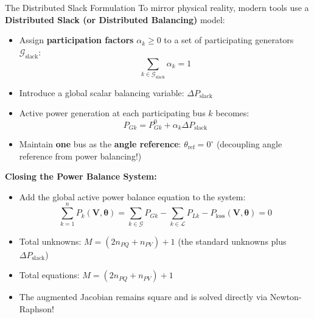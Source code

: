 \begin{frame}[allowframebreaks]{The Distributed Slack Formulation}
    To mirror physical reality, modern tools use a \textbf{Distributed Slack (or Distributed Balancing)} model:
    
    \begin{itemize}
        \item Assign \textbf{participation factors} $\alpha_k \ge 0$ to a set of participating generators $\mathcal{G}_{\text{slack}}$:
        $$\sum_{k \in \mathcal{G}_{\text{slack}}} \alpha_k = 1$$
        \item Introduce a global scalar balancing variable: $\Delta P_{\text{slack}}$
        \item Active power generation at each participating bus $k$ becomes:
        $$P_{Gk} = P_{Gk}^0 + \alpha_k \Delta P_{\text{slack}}$$
        \item Maintain \textbf{one} bus as the \textbf{angle reference}: $\theta_{\text{ref}} = 0^\circ$ (decoupling angle reference from power balancing!)
    \end{itemize}
    \textbf{Closing the Power Balance System:}
    \begin{itemize}
        \item Add the global active power balance equation to the system:
        $$\sum_{k=1}^n P_k(\mathbf{V}, \boldsymbol{\theta}) = \sum_{k \in \mathcal{G}} P_{Gk} - \sum_{k \in \mathcal{L}} P_{Lk} - P_{\text{loss}}(\mathbf{V}, \boldsymbol{\theta}) = 0$$
        \item Total unknowns: $M = (2n_{PQ} + n_{PV}) + 1$ (the standard unknowns plus $\Delta P_{\text{slack}}$)
        \item Total equations: $M = (2n_{PQ} + n_{PV}) + 1$
        \item The augmented Jacobian remains square and is solved directly via Newton-Raphson!
    \end{itemize}
\end{frame}

